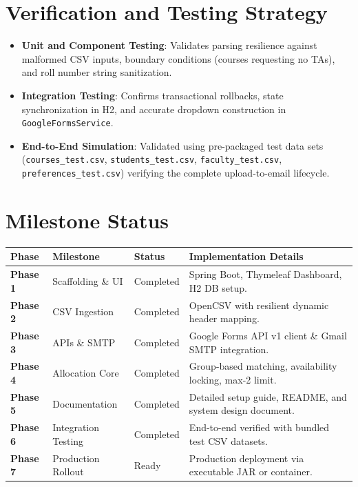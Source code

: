 \documentclass[12pt, a4paper]{article}
\begin{document}
\section{Verification and Testing Strategy}
\begin{itemize}
    \item \textbf{Unit and Component Testing}: Validates parsing resilience against malformed CSV inputs, boundary conditions (courses requesting no TAs), and roll number string sanitization.
    \item \textbf{Integration Testing}: Confirms transactional rollbacks, state synchronization in H2, and accurate dropdown construction in \texttt{GoogleFormsService}.
    \item \textbf{End-to-End Simulation}: Validated using pre-packaged test data sets (\texttt{courses\_test.csv}, \texttt{students\_test.csv}, \texttt{faculty\_test.csv}, \texttt{preferences\_test.csv}) verifying the complete upload-to-email lifecycle.
\end{itemize}

\section{Milestone Status}
\begin{table}[h]
\centering
\renewcommand{\arraystretch}{1.4}
\begin{tabular}{|p{}|p{}|p{}|p{}|}
\hline
\textbf{Phase} & \textbf{Milestone} & \textbf{Status} & \textbf{Implementation Details} \\
\hline
\textbf{Phase 1} & Scaffolding \& UI & Completed & Spring Boot, Thymeleaf Dashboard, H2 DB setup. \\
\hline
\textbf{Phase 2} & CSV Ingestion & Completed & OpenCSV with resilient dynamic header mapping. \\
\hline
\textbf{Phase 3} & APIs \& SMTP & Completed & Google Forms API v1 client \& Gmail SMTP integration. \\
\hline
\textbf{Phase 4} & Allocation Core & Completed & Group-based matching, availability locking, max-2 limit. \\
\hline
\textbf{Phase 5} & Documentation & Completed & Detailed setup guide, README, and system design document. \\
\hline
\textbf{Phase 6} & Integration Testing & Completed & End-to-end verified with bundled test CSV datasets. \\
\hline
\textbf{Phase 7} & Production Rollout & Ready & Production deployment via executable JAR or container. \\
\hline
\end{tabular}
\end{table}
\end{document}
